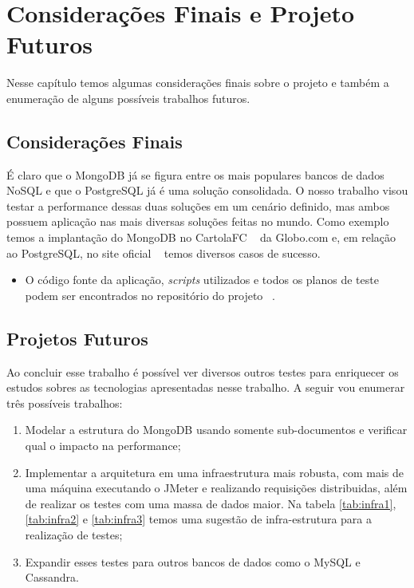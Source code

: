 \chapter{Considerações Finais e Projeto Futuros}

Nesse capítulo temos algumas considerações finais sobre o projeto e também a enumeração de alguns possíveis trabalhos futuros.

\section{Considerações Finais}

É claro que o MongoDB já se figura entre os mais populares bancos de dados NoSQL e que o PostgreSQL já é uma solução consolidada. O nosso trabalho visou testar a performance dessas duas soluções em um cenário definido, mas ambos possuem aplicação nas mais diversas soluções feitas no mundo. Como exemplo temos a implantação do MongoDB no CartolaFC ~\cite{mongocartola} da Globo.com e, em relação ao PostgreSQL, no site oficial ~\cite{usecasepostgresql}  temos diversos casos de sucesso.

\begin{itemize}
	\item O código fonte da aplicação, \textit{scripts} utilizados e todos os planos de teste podem ser encontrados no repositório do projeto ~\cite{github}.
\end{itemize}

\section{Projetos Futuros}

Ao concluir esse trabalho é possível ver diversos outros testes para enriquecer os estudos sobres as tecnologias apresentadas nesse trabalho. A seguir vou enumerar três possíveis trabalhos:

\begin{enumerate}
\item Modelar a estrutura do MongoDB usando somente sub-documentos e verificar qual o impacto na performance;
\item Implementar a arquitetura em uma infraestrutura mais robusta, com mais de uma máquina executando o JMeter e realizando requisições distribuidas, além de realizar os testes com uma massa de dados maior. Na tabela \ref{tab:infra1}, \ref{tab:infra2} e \ref{tab:infra3} temos uma sugestão de infra-estrutura para a realização de testes;
\item Expandir esses testes para outros bancos de dados como o MySQL e Cassandra.
\end{enumerate}


